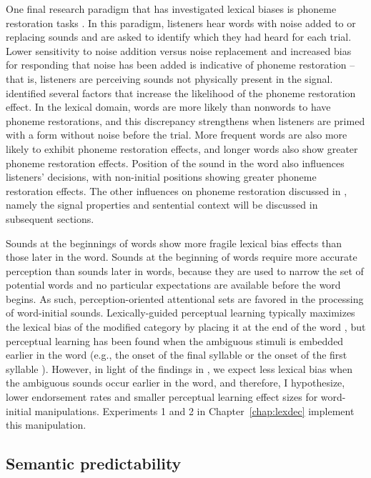 One final research paradigm that has investigated lexical biases is phoneme restoration tasks \citep{Samuel1981}.  
In this paradigm, listeners hear words with noise added to or replacing sounds and are asked to identify which they had heard for each trial.  
Lower sensitivity to noise addition versus noise replacement and increased bias for responding that noise has been added is indicative of phoneme restoration -- that is, listeners are perceiving sounds not physically present in the signal.  
\citet{Samuel1981} identified several factors that increase the likelihood of the phoneme restoration effect.
In the lexical domain, words are more likely than nonwords to have phoneme restorations, and this discrepancy strengthens when listeners are primed with a form without noise before the trial.  
More frequent words are also more likely to exhibit phoneme restoration effects, and longer words also show greater phoneme restoration effects.  
Position of the sound in the word also influences listeners' decisions, with non-initial positions showing greater phoneme restoration effects. 
The other influences on phoneme restoration discussed in \citet{Samuel1981}, namely the signal properties and sentential context will be discussed in subsequent sections.

Sounds at the beginnings of words show more fragile lexical bias effects than those later in the word.  Sounds at the beginning of words require more accurate perception than sounds later in words, because they are used to narrow the set of potential words and no particular expectations are available before the word begins.  As such, perception-oriented attentional sets are favored in the processing of word-initial sounds.  Lexically-guided perceptual learning typically maximizes the lexical bias of the modified category by placing it at the end of the word \citep{Norris2003}, but perceptual learning has been found when the ambiguous stimuli is embedded earlier in the word (e.g., the onset of the final syllable \citep{Kraljic2005, Kraljic2008, Kraljic2008a} or the onset of the first syllable \citep{Clare2014}).  However, in light of the findings in \citet{Pitt2012}, we expect less lexical bias when the ambiguous sounds occur earlier in the word, and therefore, I hypothesize, lower endorsement rates and smaller perceptual learning effect sizes for word-initial manipulations.  
Experiments 1 and 2  in Chapter~\ref{chap:lexdec} implement this manipulation.

\subsection{Semantic predictability}
\label{sec:semanticpredictability}

